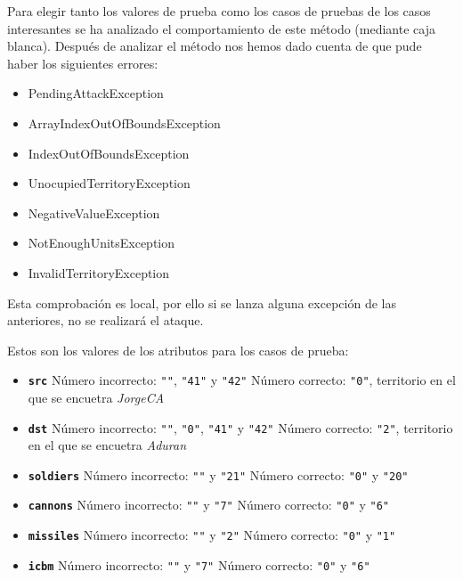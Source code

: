 Para elegir tanto los valores de prueba como los casos de pruebas de los casos interesantes se ha analizado el comportamiento de este método (mediante caja blanca). Después de analizar el método nos hemos dado cuenta de que pude haber los siguientes errores:
\begin{itemize}
\item PendingAttackException
\item ArrayIndexOutOfBoundsException
\item IndexOutOfBoundsException
\item UnocupiedTerritoryException
\item NegativeValueException
\item NotEnoughUnitsException
\item InvalidTerritoryException
\end{itemize}
Esta comprobación es local, por ello si se lanza alguna excepción de las anteriores, no se realizará el ataque.

Estos son los valores de los atributos para los casos de prueba:
\begin{itemize}
\item \textbf{\texttt{src}}
\subitem Número incorrecto: \texttt{""}, \texttt{"41"} y \texttt{"42"}
\subitem Número correcto: \texttt{"0"}, territorio en el que se encuetra \textit{JorgeCA}

\item \textbf{\texttt{dst}}
\subitem Número incorrecto: \texttt{""}, \texttt{"0"}, \texttt{"41"} y \texttt{"42"}
\subitem Número correcto: \texttt{"2"}, territorio en el que se encuetra \textit{Aduran}

\item \textbf{\texttt{soldiers}}
\subitem Número incorrecto: \texttt{""} y \texttt{"21"}
\subitem Número correcto: \texttt{"0"} y \texttt{"20"}

\item \textbf{\texttt{cannons}}
\subitem Número incorrecto: \texttt{""} y \texttt{"7"}
\subitem Número correcto: \texttt{"0"} y \texttt{"6"}

\item \textbf{\texttt{missiles}}
\subitem Número incorrecto: \texttt{""} y \texttt{"2"}
\subitem Número correcto: \texttt{"0"} y \texttt{"1"}

\item \textbf{\texttt{icbm}}
\subitem Número incorrecto: \texttt{""} y \texttt{"7"}
\subitem Número correcto: \texttt{"0"} y \texttt{"6"}
\end{itemize}

